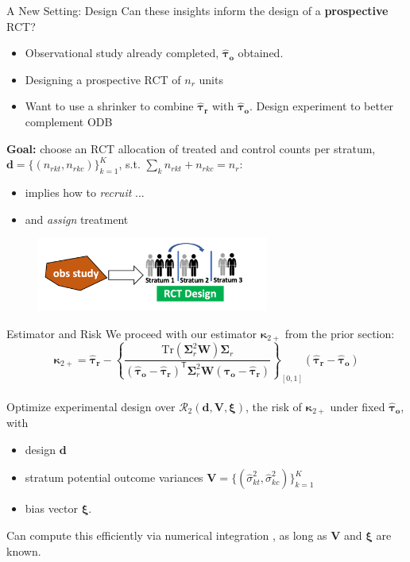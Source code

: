 \documentclass[usenames,dvipsnames]{beamer}
\newcommand{\taur}{\boldsymbol{\hat \tau_r}}
\newcommand{\htaur}{\boldsymbol{\hat \tau_r}}
\newcommand{\tauo}{\boldsymbol{\hat \tau_o}}
\newcommand{\htauo}{\boldsymbol{\hat \tau_o}}
\newcommand{\bsxi}{\boldsymbol{\xi}}
\newcommand{\bsD}{\boldsymbol{W}}
\newcommand{\bsSig}{\boldsymbol{\Sigma}}
\newcommand{\bskap}{\boldsymbol{ \kappa}}
\newcommand{\Tr}{\text{Tr}}
\let\oldcitep=\citep
\renewcommand{\citep}[1]{\textcolor[rgb]{.3,.3,.8}{\oldcitep{#1}}}
\newcommand{\tran}{\mathsf{T}}
\theoremstyle{definition} %
\begin{document}
\begin{frame}{A New Setting: Design}
Can these insights inform the design of a \textbf{prospective} RCT? 
\begin{itemize}
\item Observational study already completed, $\tauo$ obtained. 
\item Designing a prospective RCT of $n_r$ units 
\item Want to use a shrinker to combine $\taur$ with $\tauo$. Design experiment to better complement ODB \pause
\end{itemize}
\textbf{Goal:} choose an RCT allocation of treated and control counts per stratum, $\boldsymbol d = \{(n_{rkt}, n_{rkc})\}_{k = 1}^K$, s.t. $\sum_k n_{rkt} + n_{rkc} = n_r$:
\begin{itemize}
\item implies how to \emph{recruit} ... 
\item and \emph{assign} treatment 
\end{itemize}

\begin{figure}
\centering
\includegraphics[width = 0.68\textwidth]{Schematic_2}
\end{figure}
\end{frame}


 
\begin{frame}{Estimator and Risk}
We proceed with our estimator $\bskap_{2+}$ from the prior section:
\[ \bskap_{2+} = \htaur - \left\{ \frac{\Tr(\bsSig_r^2 \bsD)\bsSig_r}{(\htauo - \htaur)^\tran  \bsSig_r^2 \bsD (\htauo - \htaur) } \right\}_{[0, 1]} \left( \htaur - \htauo \right)\]
\vspace{3mm} \\ \pause
\noindent Optimize experimental design over $\mathcal{R}_2(\boldsymbol{d}, \boldsymbol V, \bsxi)$, the risk of $\bskap_{2+}$ under fixed $\tauo$, with \pause
\begin{itemize}
\item design $\boldsymbol{d}$ \pause
\item stratum potential outcome variances $\boldsymbol V = \{(\hat \sigma_{kt}^2, \hat \sigma_{kc}^2)\}_{k = 1}^K$ \pause
\item bias vector $\bsxi$.
\end{itemize} \pause
\vspace{2mm}
Can compute this efficiently via numerical integration \citep{bao2013moments}, as long as $\boldsymbol V$ and $\bsxi$ are known. 
\end{frame}
\end{document}
